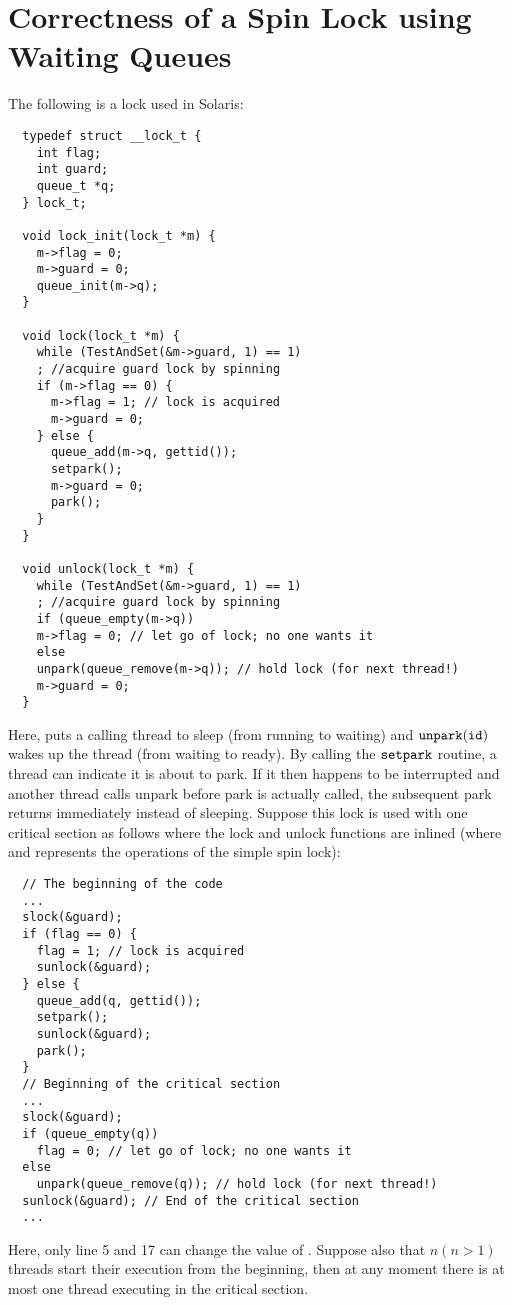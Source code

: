 \documentclass{article}[10pt]
\begin{document}
\section{Correctness of a Spin Lock using Waiting Queues}
\label{sec:spin-lock-queue}
%
\begin{mythm}
\label{thm:spin-lock-correct-queue}

The following is a lock used in Solaris:
%
\begin{lstlisting}
  typedef struct __lock_t {
    int flag;
    int guard;
    queue_t *q;
  } lock_t;

  void lock_init(lock_t *m) {
    m->flag = 0;
    m->guard = 0;
    queue_init(m->q);
  }

  void lock(lock_t *m) {
    while (TestAndSet(&m->guard, 1) == 1)
    ; //acquire guard lock by spinning
    if (m->flag == 0) {
      m->flag = 1; // lock is acquired
      m->guard = 0;
    } else {
      queue_add(m->q, gettid());
      setpark();
      m->guard = 0;
      park();
    }
  }

  void unlock(lock_t *m) {
    while (TestAndSet(&m->guard, 1) == 1)
    ; //acquire guard lock by spinning
    if (queue_empty(m->q))
    m->flag = 0; // let go of lock; no one wants it
    else
    unpark(queue_remove(m->q)); // hold lock (for next thread!)
    m->guard = 0;
  }  
\end{lstlisting}
%
Here, \kpark puts a calling thread to sleep (from running to waiting)
and $\text{\ttfamily unpark}(\text{\ttfamily id})$ wakes up the thread \kid (from waiting to ready).
%
By calling the $\text{\ttfamily setpark}$ routine, a thread can indicate it is about
to park. If it then happens to be interrupted and another thread calls
unpark before park is actually called, the subsequent park returns
immediately instead of sleeping.
%
Suppose this lock is used with one critical section as follows where
the lock and unlock functions are inlined (where \kslock and \ksunlock
represents the operations of the simple spin lock):
%
\begin{lstlisting}
  // The beginning of the code
  ...
  slock(&guard);
  if (flag == 0) {
    flag = 1; // lock is acquired
    sunlock(&guard);
  } else {
    queue_add(q, gettid());
    setpark();
    sunlock(&guard);
    park(); 
  }
  // Beginning of the critical section
  ...
  slock(&guard);
  if (queue_empty(q))
    flag = 0; // let go of lock; no one wants it
  else
    unpark(queue_remove(q)); // hold lock (for next thread!)
  sunlock(&guard); // End of the critical section
  ...
\end{lstlisting}
%
Here, only line 5 and 17 can change the value of \kflag.
%
Suppose also that $n (n > 1)$ threads start their execution from the
beginning, then at any moment there is at most one thread executing in
the critical section.
\end{mythm}
\end{document}
